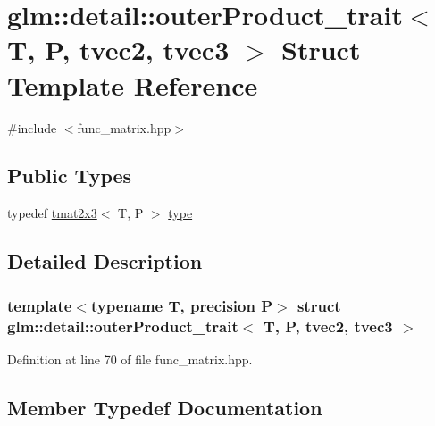 \hypertarget{structglm_1_1detail_1_1outer_product__trait_3_01_t_00_01_p_00_01tvec2_00_01tvec3_01_4}{}\section{glm\+:\+:detail\+:\+:outer\+Product\+\_\+trait$<$ T, P, tvec2, tvec3 $>$ Struct Template Reference}
\label{structglm_1_1detail_1_1outer_product__trait_3_01_t_00_01_p_00_01tvec2_00_01tvec3_01_4}


{\ttfamily \#include $<$func\+\_\+matrix.\+hpp$>$}

\subsection*{Public Types}
\begin{DoxyCompactItemize}
\item 
typedef \hyperlink{structglm_1_1detail_1_1tmat2x3}{tmat2x3}$<$ T, P $>$ \hyperlink{structglm_1_1detail_1_1outer_product__trait_3_01_t_00_01_p_00_01tvec2_00_01tvec3_01_4_a960af058d12b8de3d79562804f768d0d}{type}
\end{DoxyCompactItemize}


\subsection{Detailed Description}
\subsubsection*{template$<$typename T, precision P$>$\newline
struct glm\+::detail\+::outer\+Product\+\_\+trait$<$ T, P, tvec2, tvec3 $>$}



Definition at line 70 of file func\+\_\+matrix.\+hpp.



\subsection{Member Typedef Documentation}
\mbox{\label{structglm_1_1detail_1_1outer_product__trait_3_01_t_00_01_p_00_01tvec2_00_01tvec3_01_4_a960af058d12b8de3d79562804f768d0d}} 
